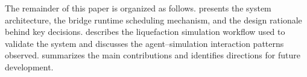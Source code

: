 The remainder of this paper is organized as follows.  presents the system architecture, the bridge runtime scheduling mechanism, and the design rationale behind key decisions.  describes the liquefaction simulation workflow used to validate the system and discusses the agent--simulation interaction patterns observed.  summarizes the main contributions and identifies directions for future development.

